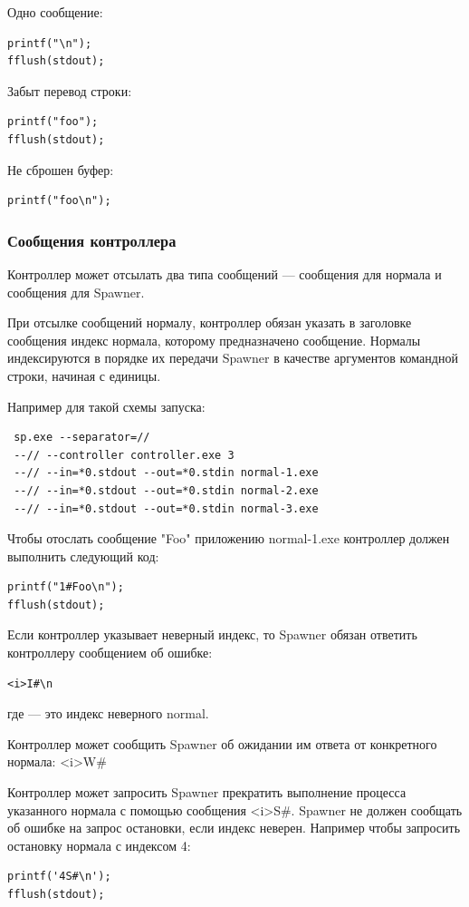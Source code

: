 \documentclass{imcs}
\begin{document}
Одно сообщение:
\begin{lstlisting}
printf("\n");
fflush(stdout);
\end{lstlisting}

Забыт перевод строки:
\begin{lstlisting}
printf("foo");
fflush(stdout);
\end{lstlisting}

Не сброшен буфер:
\begin{lstlisting}
printf("foo\n");
\end{lstlisting}

\subsubsection{Сообщения контроллера}
Контроллер может отсылать два типа сообщений — сообщения для нормала и сообщения для Spawner.

При отсылке сообщений нормалу, контроллер обязан указать в заголовке сообщения индекс нормала, которому предназначено сообщение. Нормалы индексируются в порядке их передачи Spawner в качестве аргументов командной строки, начиная с единицы.

Например для такой схемы запуска:
\begin{lstlisting}
 sp.exe --separator=//
 --// --controller controller.exe 3
 --// --in=*0.stdout --out=*0.stdin normal-1.exe
 --// --in=*0.stdout --out=*0.stdin normal-2.exe
 --// --in=*0.stdout --out=*0.stdin normal-3.exe
\end{lstlisting}

Чтобы отослать сообщение "Foo" приложению normal-1.exe контроллер должен выполнить следующий код:
\begin{lstlisting}
printf("1#Foo\n");
fflush(stdout);
\end{lstlisting}

Если контроллер указывает неверный индекс, то Spawner обязан ответить контроллеру сообщением об ошибке:
\begin{lstlisting}
<i>I#\n
\end{lstlisting}

где  — это индекс неверного normal.

Контроллер может сообщить Spawner об ожидании им ответа от конкретного нормала: <i>W\#<перевод строки>

Контроллер может запросить Spawner прекратить выполнение процесса указанного нормала с помощью сообщения <i>S\#. Spawner не должен сообщать об ошибке на запрос остановки, если индекс неверен.
Например чтобы запросить остановку нормала с индексом 4:
\begin{lstlisting}
printf('4S#\n');
fflush(stdout);
\end{lstlisting}
\end{document}
